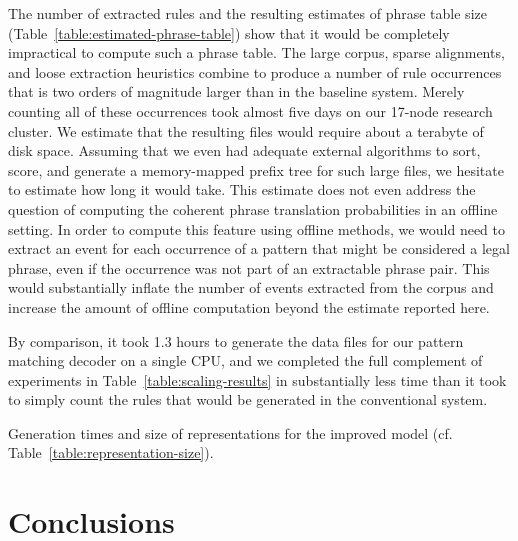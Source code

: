The number of extracted rules and the resulting estimates
of phrase table size (Table~\ref{table:estimated-phrase-table})
show that it would be completely impractical to compute such
a phrase table.  The large corpus, sparse alignments, 
and loose extraction heuristics combine to produce a number
of rule occurrences that is two orders
of magnitude larger than in the baseline system.  Merely counting
all of these occurrences took almost five days on our 17-node
research cluster.  We estimate that the resulting files would
require about a terabyte of disk space.  Assuming that we even
had adequate external algorithms to sort, score, 
and generate a memory-mapped prefix tree for such 
large files, we hesitate to estimate how
long it would take.  This estimate does not even address
the question of computing the coherent phrase translation
probabilities in an offline setting.  In order to compute this feature using offline methods, we would need to extract an event for each occurrence of a pattern that might be considered a legal phrase, even if the occurrence was not part of an extractable phrase pair.  This would substantially inflate the number of events extracted from the corpus and increase the amount of offline computation beyond the estimate reported here.

By comparison, it took 1.3 hours to generate the data files for
our pattern matching decoder on a single CPU, and we completed
the full complement of experiments in Table~\ref{table:scaling-results}
in substantially less time than it took to simply count the 
rules that would be generated in the conventional system.

\figpreamble
\begin{table}
	\begin{center}
		
	\end{center}
	\figpostamble
	\caption{Generation times and size of representations for 
		the improved model (cf. Table~\ref{table:representation-size}).}
	\label{table:estimated-phrase-table}
\end{table}

\section{Conclusions}

